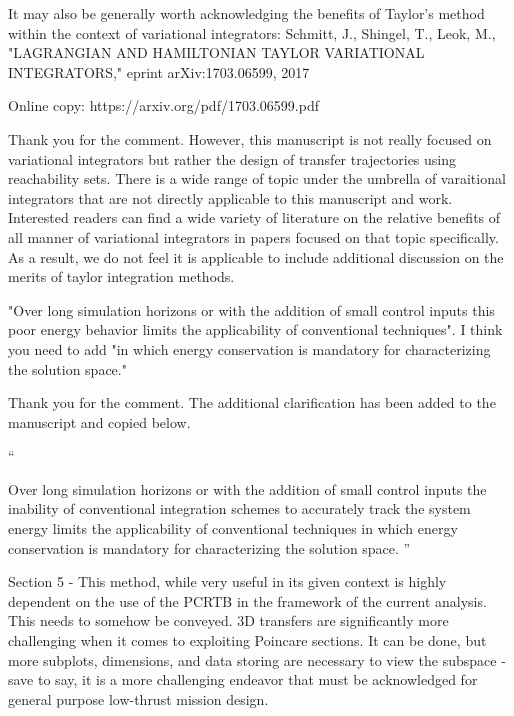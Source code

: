 \documentclass[11pt]{article}
\newenvironment{correction}{\begin{list}{}{\setlength{\leftmargin}{1cm}\setlength{\rightmargin}{1cm}}\vspace{\parsep}\item[]``}{''\end{list}}
\begin{document}
\begin{enumerate}
\item 
    \begin{itshape}
It may also be generally worth acknowledging the benefits of Taylor's method within the context of variational integrators:
Schmitt, J., Shingel, T., Leok, M., "LAGRANGIAN AND HAMILTONIAN TAYLOR VARIATIONAL INTEGRATORS," eprint arXiv:1703.06599, 2017

Online copy: https://arxiv.org/pdf/1703.06599.pdf 
\end{itshape}

Thank you for the comment.
However, this manuscript is not really focused on variational integrators but rather the design of transfer trajectories using reachability sets.
There is a wide range of topic under the umbrella of varaitional integrators that are not directly applicable to this manuscript and work.
Interested readers can find a wide variety of literature on the relative benefits of all manner of variational integrators in papers focused on that topic specifically.
As a result, we do not feel it is applicable to include additional discussion on the merits of taylor integration methods.

\item 
    \begin{itshape}
"Over long simulation horizons or with the addition of small control inputs this poor energy behavior limits the applicability of conventional techniques".  I think you need to add "in which energy conservation is mandatory for characterizing the solution space."
\end{itshape}

Thank you for the comment.
The additional clarification has been added to the manuscript and copied below.
\begin{correction}

Over long simulation horizons or with the addition of small control inputs the inability of conventional integration schemes to accurately track the system energy limits the applicability of conventional techniques in which energy conservation is mandatory for characterizing the solution space.
\end{correction}

\item 
    \begin{itshape}
Section 5 - This method, while very useful in its given context is highly dependent on the use of the PCRTB in the framework of the current analysis.  This needs to somehow be conveyed.  3D transfers are significantly more challenging when it comes to exploiting Poincare sections.  It can be done, but more subplots, dimensions, and data storing are necessary to view the subspace - save to say, it is a more challenging endeavor that must be acknowledged for general purpose low-thrust mission design.
\end{itshape}


\end{enumerate}
\end{document}

